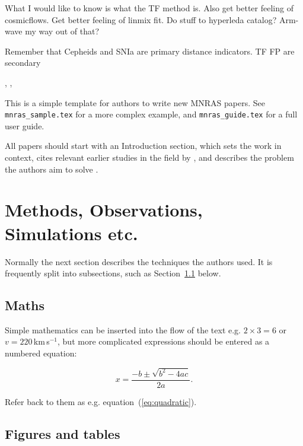 \documentclass[a4paper,fleqn,usenatbib]{mnras}
\begin{document}
What I would like to know is what the TF method is. Also get better feeling of cosmicflows. Get better feeling of linmix fit. Do stuff to hyperleda catalog? Arm-wave my way out of that?

Remember that Cepheids and SNIa are primary distance indicators. TF FP are secondary 


\citet{tf07dist}



 \citet{chaparro18}, \citet{tecciencia}, \citet{gelmanppd} \citet{brooks} \citet{tforig}



This is a simple template for authors to write new MNRAS papers.
See \texttt{mnras\_sample.tex} for a more complex example, and \texttt{mnras\_guide.tex}
for a full user guide.

All papers should start with an Introduction section, which sets the work
in context, cites relevant earlier studies in the field by \citet{photred2},
and describes the problem the authors aim to solve \citep[e.g.][]{photred1}.

\section{Methods, Observations, Simulations etc.}

Normally the next section describes the techniques the authors used.
It is frequently split into subsections, such as Section~\ref{sec:maths} below.

\subsection{Maths}
\label{sec:maths} %

Simple mathematics can be inserted into the flow of the text e.g. $2\times3=6$
or $v=220$\,km\,s$^{-1}$, but more complicated expressions should be entered
as a numbered equation:

\begin{equation}
    x=\frac{-b\pm\sqrt{b^2-4ac}}{2a}.
	\label{eq:quadratic}
\end{equation}

Refer back to them as e.g. equation~(\ref{eq:quadratic}).

\subsection{Figures and tables}
\end{document}
